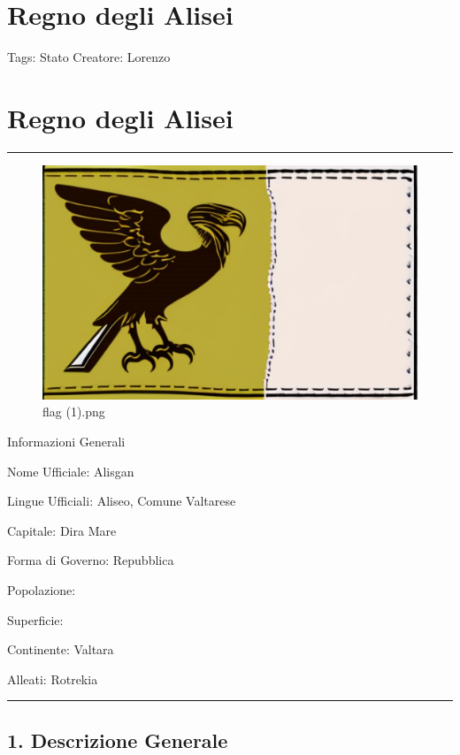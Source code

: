 \section{Regno degli Alisei}\label{regno-degli-alisei}

Tags: Stato Creatore: Lorenzo

\section{Regno degli Alisei}\label{regno-degli-alisei-1}

\begin{center}\rule{0.5\linewidth}{0.5pt}\end{center}

\begin{figure}
\centering
\includegraphics{flag_(1).png}
\caption{flag (1).png}
\end{figure}

Informazioni Generali

Nome Ufficiale: Alisgan

Lingue Ufficiali: Aliseo, Comune Valtarese

Capitale: Dira Mare

Forma di Governo: Repubblica

Popolazione:

Superficie:

Continente: Valtara

Alleati: Rotrekia

\begin{center}\rule{0.5\linewidth}{0.5pt}\end{center}

\subsection{1. Descrizione Generale}\label{descrizione-generale}

